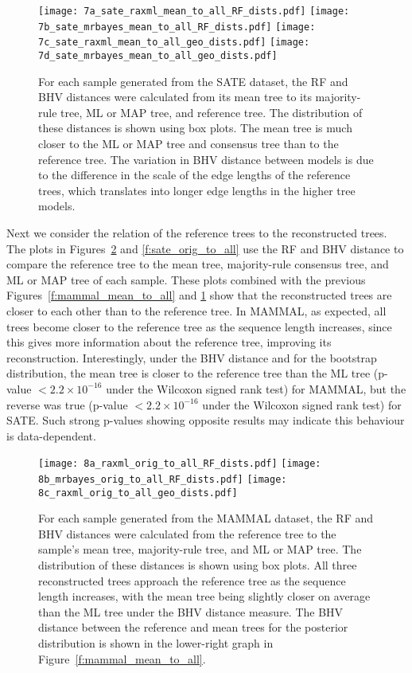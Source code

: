 \documentclass[12pt,letterpaper]{article}
\theoremstyle{plain}
\theoremstyle{definition}
\begin{document}
\begin{figure}[!htb]
\centering
\texttt{[image: 7a\_sate\_raxml\_mean\_to\_all\_RF\_dists.pdf]}
\texttt{[image: 7b\_sate\_mrbayes\_mean\_to\_all\_RF\_dists.pdf]} 
\texttt{[image: 7c\_sate\_raxml\_mean\_to\_all\_geo\_dists.pdf]} 
\texttt{[image: 7d\_sate\_mrbayes\_mean\_to\_all\_geo\_dists.pdf]} 


\caption{For each sample generated from the SATE dataset, the RF and BHV distances were calculated from its mean tree to its majority-rule tree, ML or MAP tree, and reference tree. The distribution of these distances is shown using box plots. The mean tree is much closer to the ML or MAP tree and consensus tree than to the reference tree.  The variation in BHV distance between models is due to the difference in the scale of the edge lengths of the reference trees, which translates into longer edge lengths in the higher tree models.}
\centering
\label{f:sate_mean_to_all}
\end{figure}

Next we consider the relation of the reference trees to the reconstructed trees.  The plots in Figures~\ref{f:mammal_orig_to_all} and \ref{f:sate_orig_to_all} use the RF and BHV distance to compare the reference tree to the mean tree, majority-rule consensus tree, and ML or MAP tree of each sample.  These plots combined with the previous Figures~\ref{f:mammal_mean_to_all} and \ref{f:sate_mean_to_all} show that the reconstructed trees are closer to each other than to the reference tree.  In MAMMAL, as expected, all trees become closer to the reference tree as the sequence length increases, since this gives more information about the reference tree, improving its reconstruction.  Interestingly, under the BHV distance and for the bootstrap distribution, the mean tree is closer to the reference tree than the ML tree (p-value $< 2.2 \times 10^{-16}$ under the Wilcoxon signed rank test) for MAMMAL, but the reverse was true (p-value $< 2.2 \times 10^{-16}$ under the Wilcoxon signed rank test) for SATE.  Such strong p-values showing opposite results may indicate this behaviour is data-dependent.

\begin{figure}[!htb]
\centering
\texttt{[image: 8a\_raxml\_orig\_to\_all\_RF\_dists.pdf]}
\texttt{[image: 8b\_mrbayes\_orig\_to\_all\_RF\_dists.pdf]}
\texttt{[image: 8c\_raxml\_orig\_to\_all\_geo\_dists.pdf]} 

\caption{For each sample generated from the MAMMAL dataset, the RF and BHV distances were calculated from the reference tree to the sample's mean tree, majority-rule tree, and ML or MAP tree. The distribution of these distances is shown using box plots. All three reconstructed trees approach the reference tree as the sequence length increases, with the mean tree being slightly closer on average than the ML tree under the BHV distance measure.  The BHV distance between the reference and mean trees for the posterior distribution is shown in the lower-right graph in Figure~\ref{f:mammal_mean_to_all}.}
\centering
\label{f:mammal_orig_to_all}
\end{figure}
\end{document}
